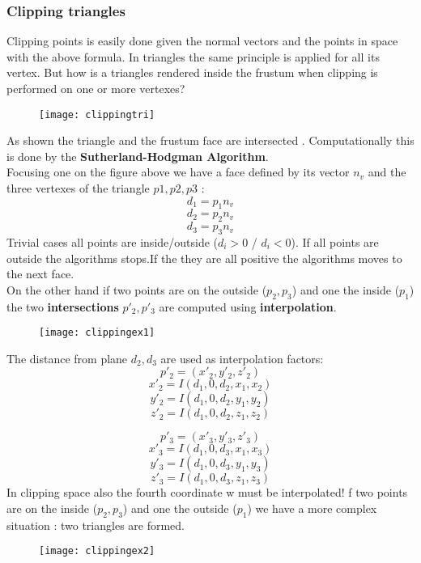 \subsubsection{Clipping triangles}
Clipping points is easily done given the normal vectors and the points in space with the above formula. In triangles the same principle is applied for all its vertex. But how is a triangles rendered inside the frustum when clipping is performed on one or more vertexes?
\begin{figure}[H]
  \centering
  \texttt{[image: clippingtri]}
\end{figure}
As shown the triangle and the frustum face are intersected . Computationally this is done by the \textbf{Sutherland-Hodgman Algorithm}.\\
Focusing one on the figure above we have a face defined by its vector $n_v$ and the three vertexes of the triangle $p1,p2,p3$ : 
$$ d_1 = p_1n_v $$
$$ d_2 = p_2n_v $$
$$ d_3 = p_3n_v $$
Trivial cases all points are inside/outside ($d_i >0$ / $d_i<0$). If all points are outside the algorithms stops.If the they are all positive the algorithms moves to the next face.\\
On the other hand if two points are on the outside ($p_2,p_3$) and one the inside ($p_1$) the two \textbf{intersections} $p'_2,p'_3$ are computed using \textbf{interpolation}. 
\begin{figure}[H]
  \centering
  \texttt{[image: clippingex1]}
\end{figure}
The distance from plane $d_2,d_3$ are used as interpolation factors: 
$$ p'_2= (x'_2,y'_2,z'_2)$$
$$ x'_2 = I(d_1,0,d_2,x_1,x_2)$$
$$ y'_2 = I(d_1,0,d_2,y_1,y_2)$$
$$ z'_2 = I(d_1,0,d_2,z_1,z_2)$$

$$ p'_3= (x'_3,y'_3,z'_3)$$
$$ x'_3 = I(d_1,0,d_3,x_1,x_3)$$
$$ y'_3 = I(d_1,0,d_3,y_1,y_3)$$
$$ z'_3 = I(d_1,0,d_3,z_1,z_3)$$
In clipping space also the fourth coordinate w must be interpolated!
f two points are on the inside ($p_2,p_3$) and one the outside ($p_1$) we have a more complex situation : two triangles are formed.
\begin{figure}[H]
  \centering
  \texttt{[image: clippingex2]}
\end{figure}